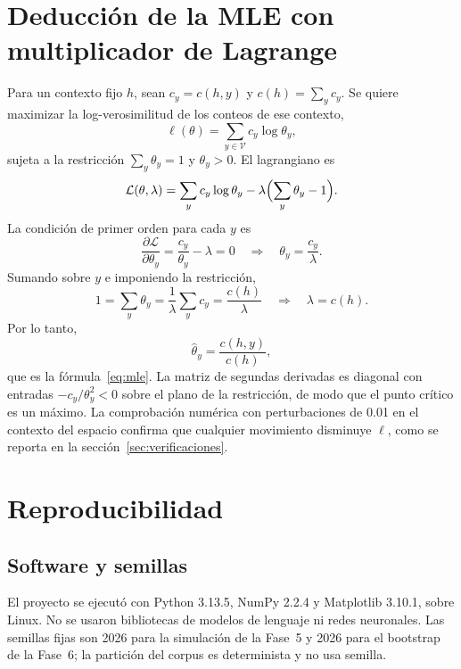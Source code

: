 \documentclass[11pt,letterpaper]{article}
\begin{document}
\appendix
\section{Deducción de la MLE con multiplicador de Lagrange}\label{anexo:mle}

Para un contexto fijo $h$, sean $c_y=c(h,y)$ y $c(h)=\sum_{y}c_y$. Se quiere maximizar la log-verosimilitud de los conteos de ese contexto,
\[
\ell(\theta)=\sum_{y\in\mathcal{V}} c_y\log \theta_y,
\]
sujeta a la restricción $\sum_{y}\theta_y=1$ y $\theta_y>0$. El lagrangiano es
\[
\mathcal{L}(\theta,\lambda)=\sum_{y}c_y\log\theta_y-\lambda\Bigl(\sum_{y}\theta_y-1\Bigr).
\]
La condición de primer orden para cada $y$ es
\[
\frac{\partial\mathcal{L}}{\partial\theta_y}=\frac{c_y}{\theta_y}-\lambda=0
\quad\Longrightarrow\quad
\theta_y=\frac{c_y}{\lambda}.
\]
Sumando sobre $y$ e imponiendo la restricción,
\[
1=\sum_{y}\theta_y=\frac{1}{\lambda}\sum_{y}c_y=\frac{c(h)}{\lambda}
\quad\Longrightarrow\quad
\lambda=c(h).
\]
Por lo tanto,
\[
\hat\theta_y=\frac{c(h,y)}{c(h)},
\]
que es la fórmula~\eqref{eq:mle}. La matriz de segundas derivadas es diagonal con entradas $-c_y/\theta_y^2<0$ sobre el plano de la restricción, de modo que el punto crítico es un máximo. La comprobación numérica con perturbaciones de 0.01 en el contexto del espacio confirma que cualquier movimiento disminuye $\ell$, como se reporta en la sección~\ref{sec:verificaciones}.

\section{Reproducibilidad}\label{anexo:repro}

\subsection*{Software y semillas}

El proyecto se ejecutó con Python 3.13.5, NumPy 2.2.4 y Matplotlib 3.10.1, sobre Linux. No se usaron bibliotecas de modelos de lenguaje ni redes neuronales. Las semillas fijas son 2026 para la simulación de la Fase~5 y 2026 para el bootstrap de la Fase~6; la partición del corpus es determinista y no usa semilla.
\end{document}
